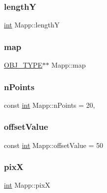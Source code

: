 \subsubsection{\texorpdfstring{lengthY}{lengthY}}
{\footnotesize\ttfamily \mbox{\hyperlink{draw_8hh_aa620a13339ac3a1177c86edc549fda9b}{int}} Mapp\+::lengthY\hspace{0.3cm}{\ttfamily [protected]}}

\mbox{\label{class_mapp_a91181e95875bc82d03e832b9d901cb59}} 
\subsubsection{\texorpdfstring{map}{map}}
{\footnotesize\ttfamily \mbox{\hyperlink{map_8hh_a714b9c2c276fbae637fee36453d9121e}{O\+B\+J\+\_\+\+T\+Y\+PE}}$\ast$$\ast$ Mapp\+::map\hspace{0.3cm}{\ttfamily [protected]}}

\mbox{\label{class_mapp_addd9fcc5e7db2c40038ab32ecf29171c}} 
\subsubsection{\texorpdfstring{nPoints}{nPoints}}
{\footnotesize\ttfamily const \mbox{\hyperlink{draw_8hh_aa620a13339ac3a1177c86edc549fda9b}{int}} Mapp\+::n\+Points = 20\hspace{0.3cm}{\ttfamily [static]}, {\ttfamily [protected]}}

\mbox{\label{class_mapp_a7a9008b7100b25833c4aff1753dc8eec}} 
\subsubsection{\texorpdfstring{offsetValue}{offsetValue}}
{\footnotesize\ttfamily const \mbox{\hyperlink{draw_8hh_aa620a13339ac3a1177c86edc549fda9b}{int}} Mapp\+::offset\+Value = 50\hspace{0.3cm}{\ttfamily [protected]}}

\mbox{\label{class_mapp_a0d751ee7f6aacc352c1ffb1bf95c21af}} 
\subsubsection{\texorpdfstring{pixX}{pixX}}
{\footnotesize\ttfamily \mbox{\hyperlink{draw_8hh_aa620a13339ac3a1177c86edc549fda9b}{int}} Mapp\+::pixX\hspace{0.3cm}{\ttfamily [protected]}}

